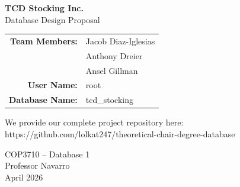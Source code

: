 \begin{titlepage}
\centering
\vspace*{3cm}

{\LARGE \textbf{TCD Stocking Inc.}}\\[1cm]
{\large Database Design Proposal}\\[2cm]

\begin{tabular}{rl}
\textbf{Team Members:} & Jacob Diaz-Iglesias \\
                        & Anthony Dreier \\
                        & Ansel Gillman \\
\textbf{User Name:} & root \\
\textbf{Database Name:} & tcd\_stocking \\
\end{tabular}

\vspace{1cm}

We provide our complete project repository here:\\
https://github.com/lolkat247/theoretical-chair-degree-database

\vfill

{\large COP3710 -- Database 1}\\
Professor Navarro\\
April 2026

\end{titlepage}
